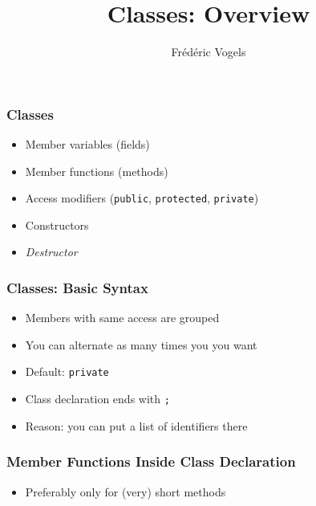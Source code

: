 \documentclass{../ucll-slides}
\title{Classes: Overview}
\author{Fr\'ed\'eric Vogels}
\newcommand{\highlightbox}[2][]{
  \draw[opacity=.75,ultra thick,red,#1] ($ (#2.south west) + (-.1,-.1) $) rectangle ($ (#2.north east) + (.1,.1) $)
}
\begin{document}
\begin{frame}
  \titlepage
\end{frame}

\begin{frame}
  \frametitle{Classes}
  \begin{itemize}
    \item Member variables (fields)
    \item Member functions (methods)
    \item Access modifiers ({\tt public}, {\tt protected}, {\tt private})
    \item Constructors
    \item \emph{Destructor}
  \end{itemize}
\end{frame}

\begin{frame}
  \frametitle{Classes: Basic Syntax}
  \begin{overprint}
    \begin{itemize}
      \item Members with same access are grouped
      \item You can alternate as many times you you want
      \item Default: {\tt private}
    \end{itemize}
    \begin{itemize}
      \item Class declaration ends with {\tt ;}
      \item Reason: you can put a list of identifiers there
    \end{itemize}
  \end{overprint}
\end{frame}

\begin{frame}
  \frametitle{Member Functions Inside Class Declaration}
  \begin{itemize}
    \item Preferably only for (very) short methods
  \end{itemize}
\end{frame}
\end{document}
